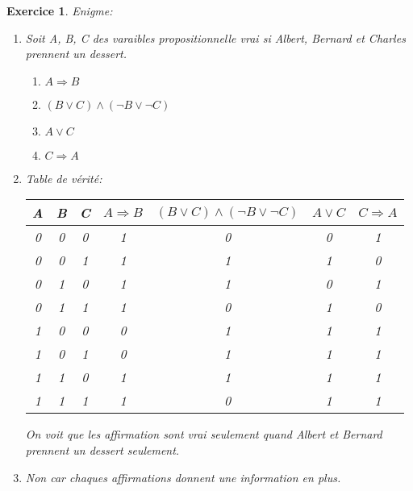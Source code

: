 \documentclass{article}
\theoremstyle{plain}
\newtheorem{exo}{Exercice}%
\begin{document}
\begin{exo} Enigme:
\begin{enumerate}
    \item Soit A, B, C des varaibles propositionnelle vrai si Albert, 
    Bernard et Charles prennent un dessert.
    \begin{enumerate}
        \item $A \Rightarrow B$
        \item $(B \vee C) \wedge (\neg B \vee \neg C)$
        \item $A \vee C$
        \item $C \Rightarrow A$
    \end{enumerate}

    \item Table de vérité:\\
    \begin{tabular}{c|c|c|c|c|c|c}
        A & B & C & $A \Rightarrow B$ & $(B \vee C) \wedge (\neg B \vee \neg C)$ &
        $A \vee C$ & $C \Rightarrow A$  \\ \hline
        0 & 0 & 0 & 1 & 0 & 0 & 1 \\
        0 & 0 & 1 & 1 & 1 & 1 & 0 \\
        0 & 1 & 0 & 1 & 1 & 0 & 1 \\
        0 & 1 & 1 & 1 & 0 & 1 & 0 \\
        1 & 0 & 0 & 0 & 1 & 1 & 1 \\
        1 & 0 & 1 & 0 & 1 & 1 & 1 \\
        1 & 1 & 0 & 1 & 1 & 1 & 1 \\
        1 & 1 & 1 & 1 & 0 & 1 & 1 \\        
    \end{tabular}

    On voit que les affirmation sont vrai seulement quand Albert et Bernard prennent
    un dessert seulement.

    \item Non car chaques affirmations donnent une information en plus.
\end{enumerate}
\end{exo}
\end{document}

